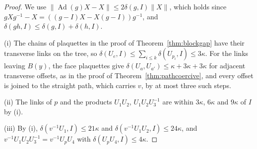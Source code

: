 \documentclass[11pt]{amsart}
\theoremstyle{definition}
\theoremstyle{remark}
\numberwithin{equation}{section}
\begin{document}
\begin{proof}
We use $\lVert\operatorname{Ad}(g)X-X\rVert\le2\delta(g,I)\lVert X\rVert$,
which holds since $gXg^{-1}-X=((g-I)X-X(g-I))g^{-1}$, and $\delta(gh,I)\le
\delta(g,I)+\delta(h,I)$.

(i) The chains of plaquettes in the proof of Theorem~\ref{thm:blockgap}
have their transverse links on the tree, so $\delta(U_e,I)\le\sum_{i\le k}
\delta(U_{p_i},I)\le3\kappa$. For the links leaving $B(y)$, the face
plaquettes give $\delta(U_a,U_{a'})\le\kappa+3\kappa+3\kappa$ for adjacent
transverse offsets, as in the proof of Theorem~\ref{thm:pathcoercive}, and
every offset is joined to the straight path, which carries $v$, by at most
three such steps.

(ii) The links of $p$ and the products $U_1U_2$, $U_1U_2U_3^{-1}$ are within
$3\kappa$, $6\kappa$ and $9\kappa$ of $I$ by (i).

(iii) By (i), $\delta(v^{-1}U_1,I)\le21\kappa$ and $\delta(v^{-1}U_1U_2,I)
\le24\kappa$, and $v^{-1}U_1U_2U_3^{-1}=v^{-1}U_pU_4$ with $\delta(U_pU_4,I)
\le4\kappa$.


\end{proof}
\end{document}
